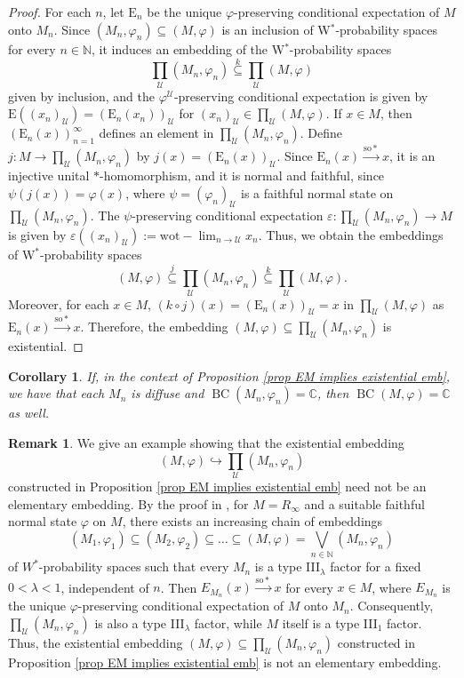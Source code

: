 \documentclass[12pt]{amsart}
\newtheorem{cor}[thm]{Corollary}
\theoremstyle{definition}
\newtheorem{remark}[thm]{Remark}
\newcommand{\N}{\mathbb{N}}
\newcommand{\ep}{\varepsilon}
\newcommand{\E}{\mathrm{E}}
\def\bb{\mathbb}
\def\bb{\mathbb}
\def\cal{\mathcal}
\def\u{\mathsf 1}
\newcommand\cU{{\cal U}}
\def \u{\mathcal U}
\def\BC{\operatorname{BC}}
\begin{document}
\begin{proof}
    For each $n$, let $\E_n$ be the unique $\varphi$-preserving conditional expectation of $M$ onto $M_n$. 
    Since $(M_n,\varphi_n)\subseteq (M,\varphi)$ is an inclusion of W$^*$-probability spaces for every $n\in \N$, it induces an embedding of the W$^*$-probability spaces $$\prod_{\cU}(M_n,\varphi_n)\stackrel{k}{\subseteq} \prod_{\cU}(M,\varphi)$$ 
    given by inclusion, and the $\varphi^{\cU}$-preserving conditional expectation is given by $\E((x_n)_{\cU})=(\E_n(x_n))_{\cU}$ for $(x_n)_{\cU}\in \prod_{\cU}(M,\varphi)$. If $x\in M$, then $(\E_n(x))_{n=1}^{\infty}$ defines an element in $\prod_{\cU}(M_n,\varphi_n)$. 
    Define $j\colon M\to \prod_{\cU}(M_n,\varphi_n)$ by $j(x)=(\E_n(x))_{\cU}$. Since 
    $\E_n(x)\xrightarrow{\mathrm{so*}}x$, it is an injective unital $*$-homomorphism, and it is normal and faithful, since $\psi(j(x))=\varphi(x)$, where $\psi=(\varphi_n)_{\cU}$ is a faithful normal state on $\prod_{\cU}(M_n,\varphi_n)$. The $\psi$-preserving conditional expectation $\ep\colon \prod_{\cU}(M_n,\varphi_n)\to M$ is given by $\ep((x_n)_{\cU}):=\mathrm{wot-}\lim_{n\to \cU}x_n$. Thus, we obtain the embeddings of W$^*$-probability spaces 
    \[(M,\varphi)\stackrel{j}{\subseteq} \prod_{\cU}(M_n,\varphi_n)\stackrel{k}{\subseteq} \prod_{\cU}(M,\varphi).\]
    Moreover, for each $x\in M$, $(k\circ j)(x)=(\E_n(x))_{\cU}=x$ in $\prod_{\cU}(M,\varphi)$ as $\E_n(x)\xrightarrow{\mathrm{so*}}x$. Therefore, the embedding $(M,\varphi)\subseteq \prod_{\cU}(M_n,\varphi_n)$ is existential.  
\end{proof}

\begin{cor}
If, in the context of Proposition \ref{prop EM implies existential emb}, we have that each $M_n$ is diffuse and $\BC(M_n,\varphi_n)=\bb C$, then $\BC(M,\varphi)=\bb C$ as well.
\end{cor}

\begin{remark}
We give an example showing that the existential embedding $$(M,\varphi)\hookrightarrow \prod_\u(M_n,\varphi_n)$$ constructed in Proposition \ref{prop EM implies existential emb} need not be an elementary embedding.  By the proof in \cite[Proposition 4.4]{goldbringhoudayer}, for $M=R_{\infty}$ and a suitable faithful normal state $\varphi$ on $M$, there exists an increasing chain of embeddings $$(M_1,\varphi_1)\subseteq (M_2,\varphi_2)\subseteq \dots \subseteq (M,\varphi)=\bigvee_{n\in \N} (M_n,\varphi_n)$$
of $W^*$-probability spaces such that every $M_n$ is a type III$_{\lambda}$ factor for a fixed $0<\lambda<1$, independent of $n$. 
Then $E_{M_n}(x)\xrightarrow{\mathrm{so*}}x$ for every $x\in M$, where $E_{M_n}$ is the unique $\varphi$-preserving conditional expectation of $M$ onto $M_n$. 
Consequently, $\prod_{\cU}(M_n,\varphi_n)$ is also a type III$_{\lambda}$ factor, while $M$ itself is a type III$_1$ factor. Thus, the existential embedding $(M,\varphi)\subseteq \prod_{\cU}(M_n,\varphi_n)$ constructed in Proposition \ref{prop EM implies existential emb} is not an elementary embedding. 
\end{remark}
\end{document}
